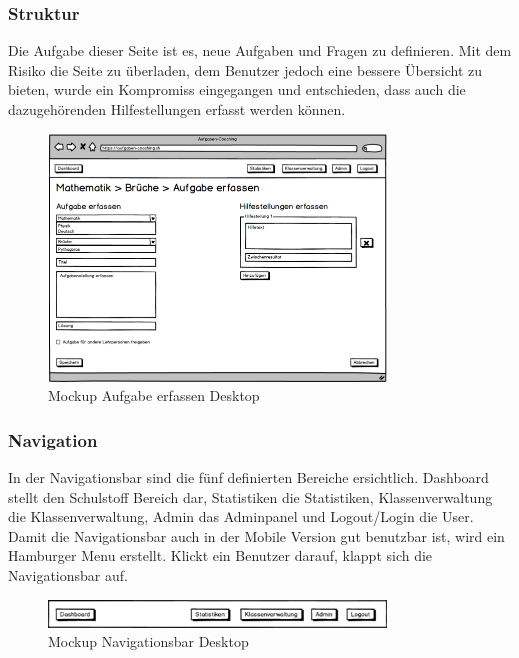 \subsubsection*{Struktur}
Die Aufgabe dieser Seite ist es, neue Aufgaben und Fragen zu definieren. Mit dem Risiko die Seite zu überladen, dem Benutzer jedoch eine bessere Übersicht zu bieten, wurde ein Kompromiss eingegangen und entschieden, dass auch die dazugehörenden Hilfestellungen erfasst werden können. \\

\begin{minipage}{\textwidth}
	\begin{figure}[H]
	\centering
		\includegraphics[width=0.8\textwidth, keepaspectratio]{images/Mockups/AufgabeErfassen_Desktop.png}
		\caption{Mockup Aufgabe erfassen Desktop}
	\end{figure}
\end{minipage}


\subsubsection*{Navigation}
In der Navigationsbar sind die fünf definierten Bereiche ersichtlich. Dashboard stellt den Schulstoff Bereich dar, Statistiken die Statistiken, Klassenverwaltung die Klassenverwaltung, Admin das Adminpanel und Logout/Login die User. \\

Damit die Navigationsbar auch in der Mobile Version gut benutzbar ist, wird ein Hamburger Menu erstellt. Klickt ein Benutzer darauf, klappt sich die Navigationsbar auf. \\

\begin{minipage}{\textwidth}
	\begin{figure}[H]
	\centering
		\includegraphics[width=0.8\textwidth, keepaspectratio]{images/Mockups/Navigationsleiste_Desktop.png}
		\caption{Mockup Navigationsbar Desktop}
	\end{figure}
\end{minipage}


